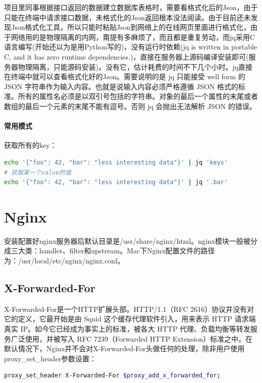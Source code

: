 \documentclass[letter]{book}
\begin{document}
项目里同事根据接口返回的数据建立数据库表格时，需要看格式化后的Json，由于只能在终端中请求接口数据，未格式化的Json返回根本没法阅读。由于目前还未发现Json格式化工具，所以只能时粘贴Json到网络上的在线网页里面进行格式化，由于网络用的是物理隔离的内网，甭提有多麻烦了，而且都是重复劳动，而jq采用C语言编写(开始还以为是用Python写的)，没有运行时依赖(jq is written in portable C, and it has zero runtime dependencies.)，直接在服务器上源码编译安装即可(服务器物理隔离，只能源码安装)。没有它，估计耗费的时间不下几个小时。jq直接在终端中就可以查看格式化好的Json。需要说明的是 jq 只能接受 well form 的 JSON 字符串作为输入内容。也就是说输入内容必须严格遵循 JSON 格式的标准。所有的属性名必须是以双引号包括的字符串。对象的最后一个属性的末尾或者数组的最后一个元素的末尾不能有逗号。否则 jq 会抛出无法解析 JSON 的错误。


\paragraph{常用模式}

获取所有的key：

\begin{lstlisting}[language=Bash]
echo '{"foo": 42, "bar": "less interesting data"}' | jq 'keys'
# 获取某一个value的值
echo '{"foo": 42, "bar": "less interesting data"}' | jq '.bar'
\end{lstlisting}

\section{Nginx}

安装配置好nginx服务器后默认目录是/usr/share/nginx/html。nginx模块一般被分成三大类：handler、filter和upstream。Mac下Nginx配置文件的路径为：/usr/local/etc/nginx/nginx.conf。

\subsection{X-Forwarded-For}

X-Forwarded-For是一个HTTP扩展头部。HTTP/1.1（RFC 2616）协议并没有对它的定义，它最开始是由 Squid 这个缓存代理软件引入，用来表示 HTTP 请求端真实 IP。如今它已经成为事实上的标准，被各大 HTTP 代理、负载均衡等转发服务广泛使用，并被写入 RFC 7239（Forwarded HTTP Extension）标准之中。在默认情况下，Nginx并不会对X-Forwarded-For头做任何的处理，除非用户使用proxy\_set\_header参数设置：

\begin{lstlisting}[language=bash]
proxy_set_header X-Forwarded-For $proxy_add_x_forwarded_for;
\end{lstlisting}
\end{document}
